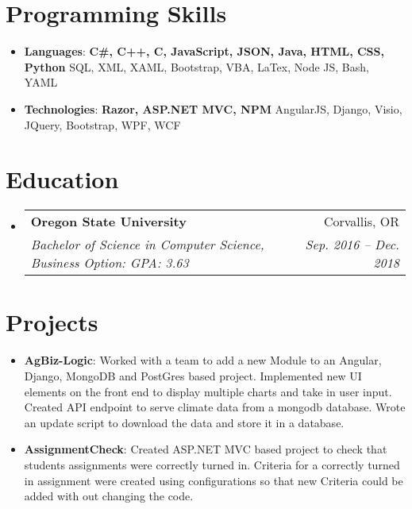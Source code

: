 \documentclass[letterpaper,11pt]{article}
\makeatletter
\newcommand{\resumeItem}[2]{
  \item\small{
    \textbf{#1}{: #2 \vspace{-2pt}}
  }
}
\newcommand{\resumeSubheading}[4]{
  \vspace{-1pt}\item
    \begin{tabular*}{0.97\textwidth}{l@{\extracolsep{\fill}}r}
      \textbf{#1} & #2 \\
      \textit{\small#3} & \textit{\small #4} \\
    \end{tabular*}\vspace{-5pt}
}
\newcommand{\resumeSubItem}[2]{\resumeItem{#1}{#2}\vspace{-4pt}}
\newcommand{\resumeSubHeadingListStart}{\begin{itemize}[leftmargin=*]}
\newcommand{\resumeSubHeadingListEnd}{\end{itemize}}
\makeatother
\begin{document}
\section{Programming Skills}
  \resumeSubHeadingListStart
    \item{
     \textbf{Languages}{: \textbf{C\#, C++, C, JavaScript, JSON, Java, HTML, CSS, Python} SQL, XML, XAML, Bootstrap, VBA, LaTex, Node JS, Bash, YAML}}
     \item{
      \textbf{Technologies}{: \textbf{Razor, ASP.NET MVC, NPM} AngularJS, Django, Visio, JQuery, Bootstrap, WPF, WCF}
    }
  \resumeSubHeadingListEnd

\section{Education}
  \resumeSubHeadingListStart
    \resumeSubheading
      {Oregon State University}{Corvallis, OR}
      {Bachelor of Science in Computer Science, Business Option:  GPA: 3.63}{Sep. 2016 -- Dec. 2018}
  \resumeSubHeadingListEnd

\section{Projects}
  \resumeSubHeadingListStart
    \resumeSubItem{AgBiz-Logic}
      {Worked with a team to add a new Module to an Angular, Django, MongoDB and PostGres based project. Implemented new UI elements on the front end to display multiple charts and take in user input. Created API endpoint to serve climate data from a mongodb database. Wrote an update script to download the data and store it in a database.}
    \resumeSubItem{AssignmentCheck}
      {Created ASP.NET MVC based project to check that students assignments were correctly turned in. Criteria for a correctly turned in assignment were created using configurations so that new Criteria could be added with out changing the code.}
  \resumeSubHeadingListEnd
\end{document}

